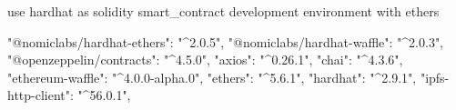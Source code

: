 use hardhat as solidity smart_contract development environment with ethers

"@nomiclabs/hardhat-ethers": "^2.0.5",
    "@nomiclabs/hardhat-waffle": "^2.0.3",
    "@openzeppelin/contracts": "^4.5.0",
    "axios": "^0.26.1",
    "chai": "^4.3.6",
    "ethereum-waffle": "^4.0.0-alpha.0",
    "ethers": "^5.6.1",
    "hardhat": "^2.9.1",
    "ipfs-http-client": "^56.0.1",